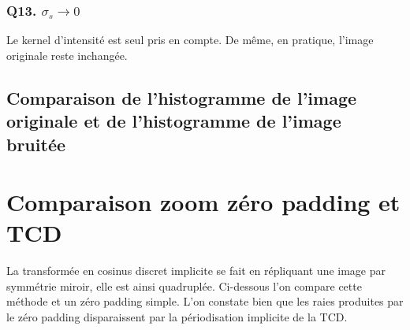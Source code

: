 \documentclass{article}
\begin{document}
\subsubsection*{Q13. $\sigma_s \rightarrow 0 $}
Le kernel d'intensité est seul pris en compte. De même, en pratique, l'image originale reste inchangée.

\subsection*{Comparaison de l'histogramme de l'image originale et de l'histogramme de l'image bruitée}

\section{Comparaison zoom zéro padding et TCD}
La transformée en cosinus discret implicite se fait en répliquant une image par symmétrie miroir, elle est ainsi quadruplée. Ci-dessous l'on compare cette méthode et un zéro padding simple. L'on constate bien que les raies produites par le zéro padding disparaissent par la périodisation implicite de la TCD.
\end{document}
